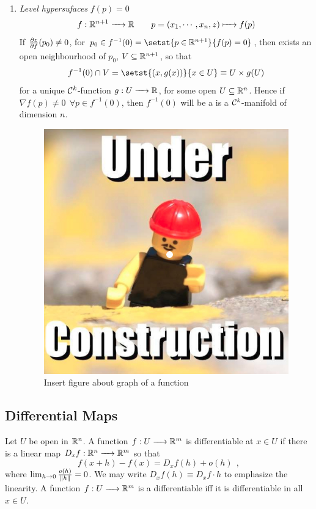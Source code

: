 \begin{example}
\begin{enumerate}[(1)]
		\item \emph{Level hypersufaces} $f(p)=0$
		$$f:\bbR^{n+1}\to\bbR \qquad p=(x_1,\cdots,x_n,z)\mapsto f(p)$$
		If $\fracpd[z]{f}(p_0)\ne0$, for $p_0 \in f^{-1}(0) = \setst{p\in\bbR^{n+1}}{f(p)=0}$, then exists an open neighbourhood of $p_0$, $V\subseteq \bbR^{n+1}$, so that
		$$ f^{-1}(0) \cap V  = \setst{(x,g(x))}{ x \in U} \equiv U\times g(U) $$
		for a unique $\calC^k$-function $g:U\to\bbR$, for some open $U\subseteq\bbR^{n}$.
		Hence if $\nabla f (p)\ne 0 ~~\forall p \in f^{-1}(0)$, then $f^{-1}(0)$ will be a is a $\calC^k$-manifold of dimension $n$.
		\begin{figure}[H]
			\centering
			\includegraphics[scale=0.20]{Figures/underconstruction.jpg}
			\caption{\color{red} Insert figure about graph of a function}
		\end{figure}	
	\end{enumerate}
\end{example}

\clearpage

\subsection{Differential Maps}

\begin{definition}
	Let $U$ be open in $\bbR^n$. A function $f:U\to\bbR^m$ is differentiable at $x\in U$ if there is a linear map $D_x f : \bbR^n\to\bbR^m$ so that
	$$ f(x + h) - f(x) = D_x f(h) + o(h) ~~,$$
	where $\lim_{h\sto0} \frac{o(h)}{\norm{h}} = 0$. We may write  $D_x f(h)\equiv D_x f \cdot h$ to emphasize the linearity.
	A function $f:U\to\bbR^m$ is a differentiable iff it is differentiable in all $x\in U$.
\end{definition}

